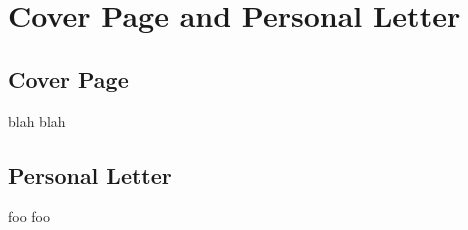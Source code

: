 \chapter{Cover Page and Personal Letter}

\section{Cover Page} \label{sec:cover-page}
blah blah

\section{Personal Letter} \label{sec:personal-letter}
foo foo
